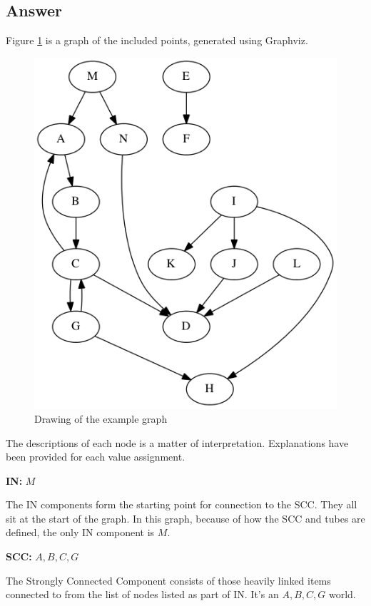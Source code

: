 \documentclass[letterpaper,11pt]{article}
\begin{document}
\newpage
\subsection*{Answer}
Figure \ref{fig:q3graph} is a graph of the included points, generated using Graphviz.

\begin{figure}
\includegraphics[scale=0.5]{work/q3.png}
\caption{Drawing of the example graph}
\label{fig:q3graph}
\end{figure}

The descriptions of each node is a matter of interpretation.  Explanations have been provided for each value assignment.

\textbf{IN:}  $M$

The IN components form the starting point for connection to the SCC\cite{broder2000}.  They all sit at the start of the graph.  In this graph, because of how the SCC and tubes are defined, the only IN component is $M$.

\textbf{SCC:}  $A, B, C, G$

The Strongly Connected Component consists of those heavily linked items connected to from the list of nodes listed as part of IN\cite{broder2000}.  It's an $A, B, C, G$ world.
\end{document}
